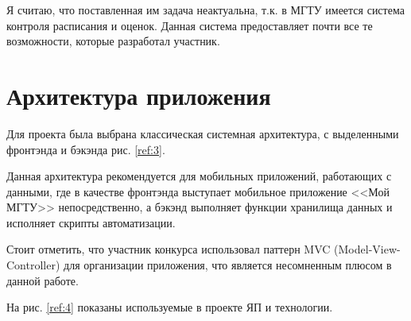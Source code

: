 \documentclass[12pt]{report}
\begin{document}
Я считаю, что поставленная им задача неактуальна, т.к. в МГТУ имеется 
система контроля расписания и оценок. Данная система предоставляет почти все те возможности, 
которые разработал участник. 

\section{Архитектура приложения}

Для проекта была выбрана классическая системная архитектура,
с выделенными фронтэнда и бэкэнда рис. \ref{ref:3}.

\begin{figure}[ht!]	
\end{figure}

Данная архитектура рекомендуется для мобильных приложений, работающих с данными, 
где в качестве фронтэнда выступает 
мобильное приложение <<Мой МГТУ>> непосредственно, а бэкэнд выполняет функции 
хранилища данных и исполняет скрипты автоматизации.

Стоит отметить, что участник конкурса использовал паттерн MVC (Model-View-Controller)
для организации приложения, что является несомненным плюсом в данной работе.

На рис. \ref{ref:4} показаны используемые в проекте ЯП и технологии.

\begin{figure}[ht!]	
\end{figure}
\end{document}
